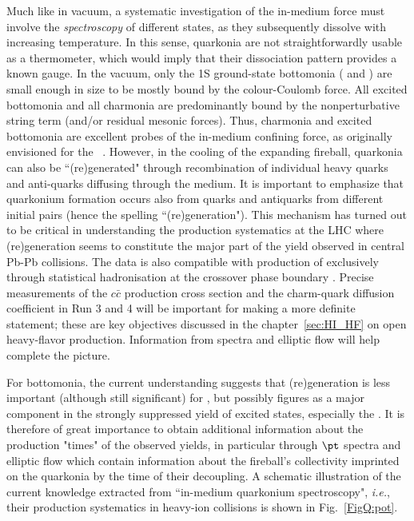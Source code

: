 \documentclass[../report.tex]{subfiles}
\begin{document}
Much like in vacuum, a systematic investigation of the in-medium force must involve the {\em spectroscopy} of different states, as they subsequently dissolve with increasing temperature. In this sense, quarkonia are not straightforwardly usable as a thermometer, which would imply that their dissociation pattern provides a known gauge. In the vacuum, only the 1S ground-state bottomonia ( and \PGhb) are small enough in size to be mostly bound by the colour-Coulomb force. All excited bottomonia and all charmonia are predominantly bound by the nonperturbative string term (and/or residual mesonic forces). 
Thus, charmonia and excited bottomonia are excellent probes of the in-medium confining force, as originally envisioned for the \PJgy~\cite{Matsui:1986dk}.
However, in the cooling of the expanding fireball, quarkonia can also be ``(re)generated" through recombination of individual heavy quarks and anti-quarks diffusing through the medium. It is important to emphasize that quarkonium formation occurs also from quarks and antiquarks from different initial pairs (hence the spelling ``(re)generation").
This mechanism \cite{BraunMunzinger:2000px,Thews:2000rj} has turned out to be critical in understanding the \PJgy production systematics at the LHC where (re)generation seems to constitute the major part of the yield observed in central Pb-Pb collisions.
The data is also compatible with production of \PJgy exclusively through statistical hadronisation at the crossover phase boundary \cite{Andronic:2017pug}.
Precise measurements of the $c\bar{c}$ production cross section and the charm-quark diffusion coefficient in Run 3 and 4 will be important for making a more definite statement; these are key objectives discussed in the chapter~\ref{sec:HI_HF} on open heavy-flavor production. Information from \pt spectra and elliptic flow will help complete the picture.

For bottomonia, the current understanding suggests that (re)generation is less important (although still significant) for , but possibly figures as a major component in the strongly suppressed yield of excited states, especially the . It is therefore of great importance to obtain additional information about the production "times" of the observed yields, in particular through $\pt$ spectra and elliptic flow which contain information about the fireball's collectivity imprinted on the quarkonia by the time of their decoupling. A schematic illustration of the current knowledge extracted from ``in-medium quarkonium spectroscopy", {\it i.e.}, their production systematics in heavy-ion collisions is shown in Fig.~\ref{FigQ:pot}.        
\end{document}
